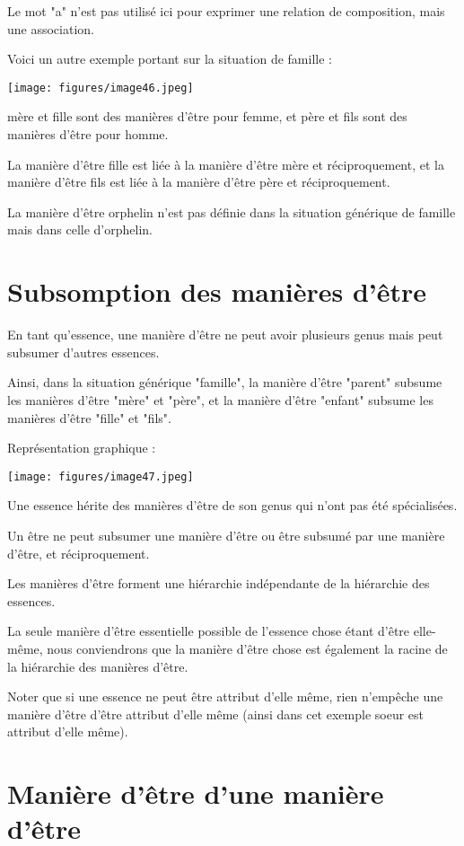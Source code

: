 \documentclass[a4paper, 12pt, openright, french]{book}
\begin{document}
Le mot "a" n'est pas utilisé ici pour exprimer une
relation de composition, mais une association.

Voici un autre exemple portant sur la situation de famille :

\texttt{[image: figures/image46.jpeg]}

mère et fille sont des manières d'être pour femme, et
père et fils sont des manières d'être pour homme.

La manière d'être fille est liée à la manière
d'être mère et réciproquement, et la manière
d'être fils est liée à la manière d'être
père et réciproquement.

La manière d'être orphelin n'est pas
définie dans la situation générique de famille mais dans celle
d'orphelin.

\newpage
\section{Subsomption des manières d'être}

En tant qu'essence, une manière d'être
ne peut avoir plusieurs genus mais peut subsumer
d'autres essences.

Ainsi, dans la situation générique "famille", la manière
d'être "parent" subsume les manières
d'être "mère" et "père", et la manière
d'être "enfant" subsume les manières
d'être "fille" et "fils".

Représentation graphique :

\texttt{[image: figures/image47.jpeg]}

Une essence hérite des manières d'être de son genus qui
n'ont pas été spécialisées.

Un être ne peut subsumer une manière d'être ou être
subsumé par une manière d'être, et réciproquement.

Les manières d'être forment une hiérarchie indépendante
de la hiérarchie des essences.

La seule manière d'être essentielle possible de
l'essence chose étant d'être elle-même,
nous conviendrons que la manière d'être chose est
également la racine de la hiérarchie des manières
d'être.

Noter que si une essence ne peut être attribut d'elle
même, rien n'empêche une manière d'être
d'être attribut d'elle même (ainsi dans
cet exemple soeur est attribut d'elle même).

\newpage
\section{Manière d'être d'une manière d'être}
\end{document}
